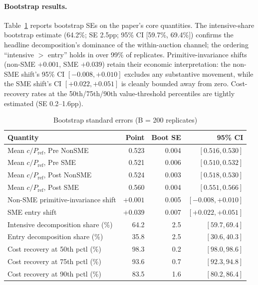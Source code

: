 \documentclass[12pt]{article}
\begin{document}
\paragraph{Bootstrap results.}
Table~\ref{tab:bootstrap-se} reports bootstrap SEs on the
paper's core quantities. The intensive-share bootstrap estimate
(64.2\%; SE 2.5pp; 95\% CI [59.7\%, 69.4\%]) confirms the
headline decomposition's dominance of the within-auction channel;
the ordering ``intensive $>$ entry'' holds in over 99\% of
replicates. Primitive-invariance shifts (non-SME $+0.001$, SME
$+0.039$) retain their economic interpretation: the non-SME
shift's 95\% CI $[-0.008, +0.010]$ excludes any substantive
movement, while the SME shift's CI $[+0.022, +0.051]$ is
cleanly bounded away from zero. Cost-recovery rates at the
50th/75th/90th value-threshold percentiles are tightly
estimated (SE 0.2--1.6pp).

\begin{table}[htbp]
\centering
\caption{Bootstrap standard errors (B = 200 replicates)}
\label{tab:bootstrap-se}
\small
\begin{tabular}{lrrr}
\toprule
Quantity & Point & Boot SE & 95\% CI \\
\midrule
Mean $c/P_{\text{ref}}$, Pre NonSME & 0.523 & 0.004 & $[0.516, 0.530]$ \\
Mean $c/P_{\text{ref}}$, Pre SME    & 0.521 & 0.006 & $[0.510, 0.532]$ \\
Mean $c/P_{\text{ref}}$, Post NonSME & 0.524 & 0.003 & $[0.518, 0.530]$ \\
Mean $c/P_{\text{ref}}$, Post SME   & 0.560 & 0.004 & $[0.551, 0.566]$ \\
\midrule
Non-SME primitive-invariance shift  & $+0.001$ & 0.005 & $[-0.008, +0.010]$ \\
SME entry shift                      & $+0.039$ & 0.007 & $[+0.022, +0.051]$ \\
\midrule
Intensive decomposition share (\%)   & 64.2 & 2.5 & $[59.7, 69.4]$ \\
Entry decomposition share (\%)       & 35.8 & 2.5 & $[30.6, 40.3]$ \\
\midrule
Cost recovery at 50th pctl (\%)     & 98.3 & 0.2 & $[98.0, 98.6]$ \\
Cost recovery at 75th pctl (\%)     & 93.6 & 0.7 & $[92.3, 94.8]$ \\
Cost recovery at 90th pctl (\%)     & 83.5 & 1.6 & $[80.2, 86.4]$ \\
\bottomrule
\end{tabular}
\end{table}
\end{document}
